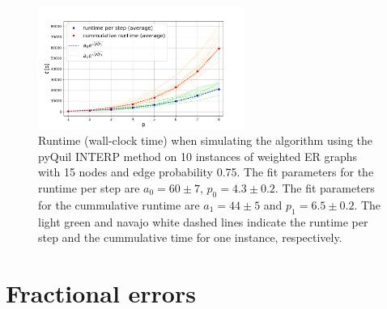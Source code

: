 \begin{figure}[H]
	\centering
	\includegraphics[width=0.6\textwidth]{figures/interp/runtime_15-nodal_ER075.png}
	\caption{Runtime (wall-clock time) when simulating the algorithm using the pyQuil INTERP method on 10 instances of weighted ER graphs with 15 nodes and edge probability 0.75. The fit parameters for the runtime per step are $a_0 = 60 \pm 7$, $p_0 = 4.3 \pm 0.2$. The fit parameters for the cummulative runtime are $a_1 = 44 \pm 5$ and $p_1 = 6.5\pm 0.2$. The light green and navajo white dashed lines indicate the runtime per step and the cummulative time for one instance, respectively.}
\end{figure}

\chapter{Fractional errors}
\label{appendix:fractional-error}

